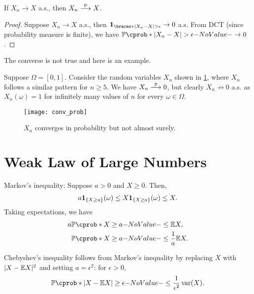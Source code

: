 \documentclass[12pt]{article}
\begin{document}
\begin{Lemma}\label{wk5:Lem:Convergence in probability}
If $X_n \to X$ a.s., then $X_n \stackrel{\mathrm{p}}{\longrightarrow} X$.
\end{Lemma}
\begin{proof}
Suppose $X_n \to X$ a.s., then $\indicator{|X_n-X|> \epsilon} \to 0$ a.s. From DCT (since probability measure is finite), we have $\P(|X_n-X|> \epsilon)\to 0$.
\end{proof}

The converse is not true and here is an example.

\begin{Example}
Suppose $\Omega=[0,1]$. Consider the random variables $X_n$ shown in \cref{wk5:fg:Counter Example}, where $X_n$ follows a similar pattern for $n\geq 5$. We have $X_n \stackrel{\mathrm{p}}{\longrightarrow} 0$, but clearly $X_n \nrightarrow 0$ a.s. as $X_n(\omega) = 1$ for infinitely many values of $n$ for every $\omega\in\Omega$.

\begin{figure}[!htb]
\centering
\texttt{[image: conv\_prob]} 
\caption{$X_n$ converges in probability but not almost surely.} 
\label{wk5:fg:Counter Example}
\end{figure}
\end{Example}

\section{Weak Law of Large Numbers}

Markov’s inequality: Suppose $a>0$ and $X\geq 0$. Then, 
\begin{align*}
a {\bf 1}_{\{X\geq a\}}(\omega) \leq X{\bf 1}_{\{X\geq a\}}(\omega)\leq X.
\end{align*}
Taking expectations, we have
\begin{align*}
a\P(X\geq a) & \leq \E X,\\
\P(X\geq a) & \leq \frac{1}{a}\E X.
\end{align*}

Chebyshev's inequality follows from Markov's inequality by replacing $X$ with $|X- \E X|^2$ and setting $a=\epsilon^2$: for $\epsilon>0$, 
\begin{align*}
\P( |X- \E X | \geq \epsilon) \leq \frac{1}{\epsilon ^2} \var(X).
\end{align*}
\end{document}
